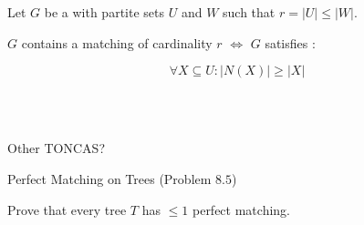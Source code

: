 
\begin{frame}{}
  \begin{theorem}
    Let $G$ be a  with partite sets $U$ and $W$ such that $r = |U| \le |W|$.

    $G$ contains a matching of cardinality $r$ $\iff$ $G$ satisfies :

    \[
      \forall X \subseteq U: \big\lvert N(X) \big\rvert \ge \big\lvert X \big\rvert
    \]
  \end{theorem}

  \pause
  \begin{center}
     \\[5pt]
     \\[8pt]
  \end{center}

  \pause
  \vspace{-0.30cm} 
  \vspace{-0.30cm} 
  \centerline{\footnotesize Other TONCAS?}
\end{frame}

\begin{frame}{}
  \begin{exampleblock}{Perfect Matching on Trees (Problem $8.5$)}
    \begin{center}
      Prove that every tree $T$ has $\le 1$ perfect matching.
    \end{center}
  \end{exampleblock}

  \pause
  \vspace{0.60cm}
  \begin{columns}
  \end{columns}

  \begin{center}
  \end{center}
\end{frame}

